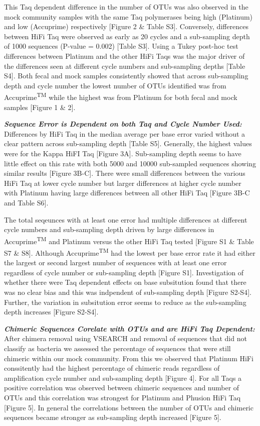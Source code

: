 \documentclass[12pt,]{article}
\begin{document}
This Taq dependent difference in the number of OTUs was also observed in
the mock community samples with the same Taq polymerases being high
(Platinum) and low (Accuprime) respectively {[}Figure 2 \& Table S3{]}.
Conversely, differences between HiFi Taq were observed as early as 20
cycles and a sub-sampling depth of 1000 sequences (P-value = 0.002)
{[}Table S3{]}. Using a Tukey post-hoc test differences between Platinum
and the other HiFi Taqs was the major driver of the differences seen at
different cycle numbers and sub-sampling depths {[}Table S4{]}. Both
fecal and mock samples consistently showed that across sub-sampling
depth and cycle number the lowest number of OTUs identified was from
Accuprime\textsuperscript{TM} while the highest was from Platinum for
both fecal and mock samples {[}Figure 1 \& 2{]}.

\textbf{\emph{Sequence Error is Dependent on both Taq and Cycle Number
Used:}} Differences by HiFi Taq in the median average per base error
varied without a clear pattern across sub-sampling depth {[}Table S5{]}.
Generally, the highest values were for the Kappa HiFI Taq {[}Figure
3A{]}. Sub-sampling depth seems to have little effect on this rate with
both 5000 and 10000 sub-sampled sequences showing similar results
{[}Figure 3B-C{]}. There were small differences between the various HiFi
Taq at lower cycle number but larger differences at higher cycle number
with Platinum having large differences between all other HiFi Taq
{[}Figure 3B-C and Table S6{]}.

The total seqeunces with at least one error had multiple differences at
different cycle numbers and sub-sampling depth driven by large
differences in Accuprime\textsuperscript{TM} and Platinum versus the
other HiFi Taq tested {[}Figure S1 \& Table S7 \& S8{]}. Although
Accuprime\textsuperscript{TM} had the lowest per base error rate it had
either the largest or second largest number of sequences with at least
one error regardless of cycle number or sub-sampling depth {[}Figure
S1{]}. Investigation of whether there were Taq dependent effects on base
subsitution found that there was no clear bias and this was indpendent
of sub-sampling depth {[}Figure S2-S4{]}. Further, the variation in
subsitution error seems to reduce as the sub-sampling depth increases
{[}Figure S2-S4{]}.

\textbf{\emph{Chimeric Sequences Corelate with OTUs and are HiFi Taq
Dependent:}} After chimera removal using VSEARCH and removal of
sequences that did not classify as bacteria we assessed the percentage
of sequences that were still chimeric within our mock community. From
this we observed that Platinum HiFi conssitently had the highest
percentage of chimeric reads regardless of amplification cycle number
and sub-sampling depth {[}Figure 4{]}. For all Taqs a positive
correlation was observed between chimeric sequences and number of OTUs
and this correlation was strongest for Platinum and Phusion HiFi Taq
{[}Figure 5{]}. In general the correlations between the number of OTUs
and chimeric sequences became stronger as sub-sampling depth increased
{[}Figure 5{]}.
\end{document}
